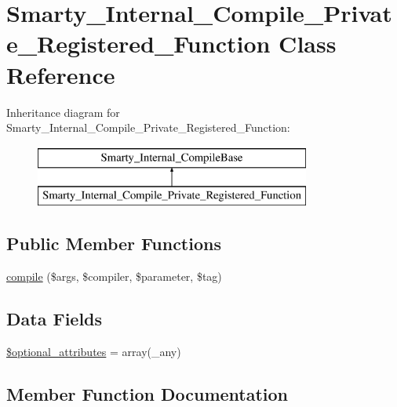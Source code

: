 \hypertarget{class_smarty___internal___compile___private___registered___function}{}\section{Smarty\+\_\+\+Internal\+\_\+\+Compile\+\_\+\+Private\+\_\+\+Registered\+\_\+\+Function Class Reference}
\label{class_smarty___internal___compile___private___registered___function}
Inheritance diagram for Smarty\+\_\+\+Internal\+\_\+\+Compile\+\_\+\+Private\+\_\+\+Registered\+\_\+\+Function\+:\begin{figure}[H]
\begin{center}
\leavevmode
\includegraphics[height=2.000000cm]{class_smarty___internal___compile___private___registered___function}
\end{center}
\end{figure}
\subsection*{Public Member Functions}
\begin{DoxyCompactItemize}
\item 
\hyperlink{class_smarty___internal___compile___private___registered___function_a140574a18ac861c95ce0def79d0223ae}{compile} (\$args, \$compiler, \$parameter, \$tag)
\end{DoxyCompactItemize}
\subsection*{Data Fields}
\begin{DoxyCompactItemize}
\item 
\hyperlink{class_smarty___internal___compile___private___registered___function_a899d1eb4a6fecbd6ce696adb171c80a4}{\$optional\+\_\+attributes} = array(\textquotesingle{}\+\_\+any\textquotesingle{})
\end{DoxyCompactItemize}


\subsection{Member Function Documentation}
\hypertarget{class_smarty___internal___compile___private___registered___function_a140574a18ac861c95ce0def79d0223ae}{}
